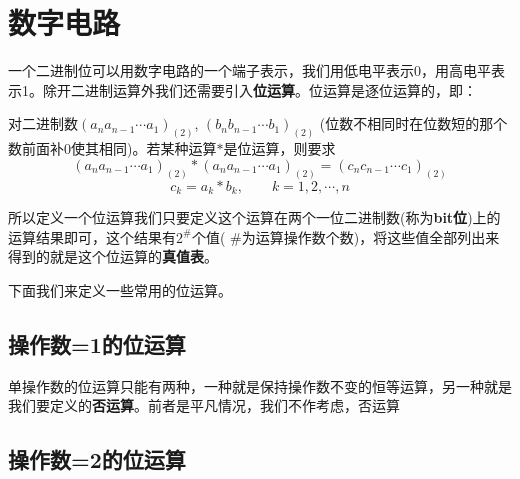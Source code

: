 \section*{数字电路}
\par 一个二进制位可以用数字电路的一个端子表示，我们用低电平表示0，用高电平表示1。除开二进制运算外我们还需要引入\textbf{位运算}。位运算是逐位运算的，即：
\begin{definition*}
    对二进制数$(a_na_{n-1}\cdots a_1)_{(2)}$, $(b_nb_{n-1}\cdots b_1)_{(2)}$ (位数不相同时在位数短的那个数前面补0使其相同)。若某种运算$*$是位运算，则要求
    $$(a_na_{n-1}\cdots a_1)_{(2)}*(a_na_{n-1}\cdots a_1)_{(2)}=(c_nc_{n-1}\cdots c_1)_{(2)}$$
    $$c_k=a_k*b_k,\qquad k=1,2,\cdots,n$$
\end{definition*}
\par 所以定义一个位运算我们只要定义这个运算在两个一位二进制数(称为\textbf{bit位})上的运算结果即可，这个结果有$2^\#$个值( $\#$为运算操作数个数)，将这些值全部列出来得到的就是这个位运算的\textbf{真值表}。
\par 下面我们来定义一些常用的位运算。
\subsection*{操作数=1的位运算}
\par 单操作数的位运算只能有两种，一种就是保持操作数不变的恒等运算，另一种就是我们要定义的\textbf{否运算}。前者是平凡情况，我们不作考虑，否运算
\subsection*{操作数=2的位运算}